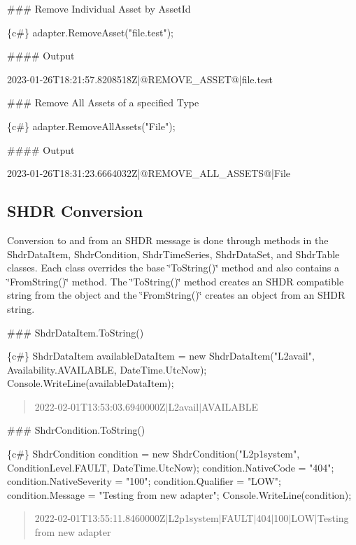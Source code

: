 \#\#\# Remove Individual Asset by Asset\+Id 
\begin{DoxyCode}
\{c#\}
adapter.RemoveAsset("file.test");
\end{DoxyCode}
 \#\#\#\# Output 
\begin{DoxyCode}
2023-01-26T18:21:57.8208518Z|@REMOVE\_ASSET@|file.test
\end{DoxyCode}


\#\#\# Remove All Assets of a specified Type 
\begin{DoxyCode}
\{c#\}
adapter.RemoveAllAssets("File");
\end{DoxyCode}
 \#\#\#\# Output 
\begin{DoxyCode}
2023-01-26T18:31:23.6664032Z|@REMOVE\_ALL\_ASSETS@|File
\end{DoxyCode}


\subsection*{S\+H\+DR Conversion}

Conversion to and from an S\+H\+DR message is done through methods in the Shdr\+Data\+Item, Shdr\+Condition, Shdr\+Time\+Series, Shdr\+Data\+Set, and Shdr\+Table classes. Each class overrides the base \char`\"{}\+To\+String()\char`\"{} method and also contains a \char`\"{}\+From\+String()\char`\"{} method. The \char`\"{}\+To\+String()\char`\"{} method creates an S\+H\+DR compatible string from the object and the \char`\"{}\+From\+String()\char`\"{} creates an object from an S\+H\+DR string.

\#\#\# Shdr\+Data\+Item.\+To\+String() 
\begin{DoxyCode}
\{c#\}
ShdrDataItem availableDataItem = new ShdrDataItem("L2avail", Availability.AVAILABLE, DateTime.UtcNow);
Console.WriteLine(availableDataItem);
\end{DoxyCode}
 \begin{quote}
2022-\/02-\/01\+T13\+:53\+:03.\+6940000Z$\vert$\+L2avail$\vert$\+A\+V\+A\+I\+L\+A\+B\+LE \end{quote}


\#\#\# Shdr\+Condition.\+To\+String() 
\begin{DoxyCode}
\{c#\}
ShdrCondition condition = new ShdrCondition("L2p1system", ConditionLevel.FAULT, DateTime.UtcNow);
condition.NativeCode = "404";
condition.NativeSeverity = "100";
condition.Qualifier = "LOW";
condition.Message = "Testing from new adapter";
Console.WriteLine(condition);
\end{DoxyCode}
 \begin{quote}
2022-\/02-\/01\+T13\+:55\+:11.\+8460000Z$\vert$\+L2p1system$\vert$\+F\+A\+U\+L\+T$\vert$404$\vert$100$\vert$\+L\+O\+W$\vert$\+Testing from new adapter \end{quote}


